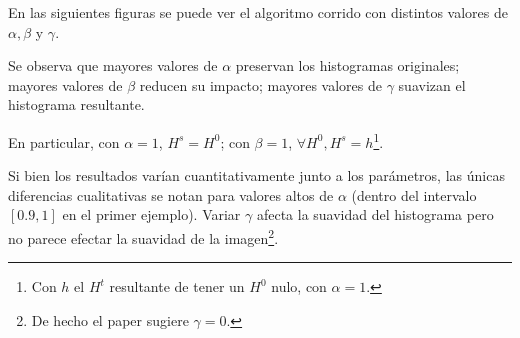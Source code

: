 \par En las siguientes figuras se puede ver el algoritmo corrido con distintos valores de $\alpha, \beta$ y $\gamma$.

\par Se observa que mayores valores de $\alpha$ preservan los histogramas originales;
mayores valores de $\beta$ reducen su impacto;
mayores valores de $\gamma$ suavizan el histograma resultante.

\par En particular, con $\alpha = 1$, $H^s = H^0$; con $\beta = 1$, $\forall H^0, H^s = h$\footnote{Con $h$ el $H^t$ resultante de tener un $H^0$ nulo, con $\alpha = 1$.}.

\par Si bien los resultados varían cuantitativamente junto a los parámetros, las únicas diferencias cualitativas se notan para valores altos de $\alpha$ (dentro del intervalo $[0.9, 1]$ en el primer ejemplo).
Variar $\gamma$ afecta la suavidad del histograma pero no parece efectar la suavidad de la imagen\footnote{De hecho el paper sugiere $\gamma = 0$.}.

